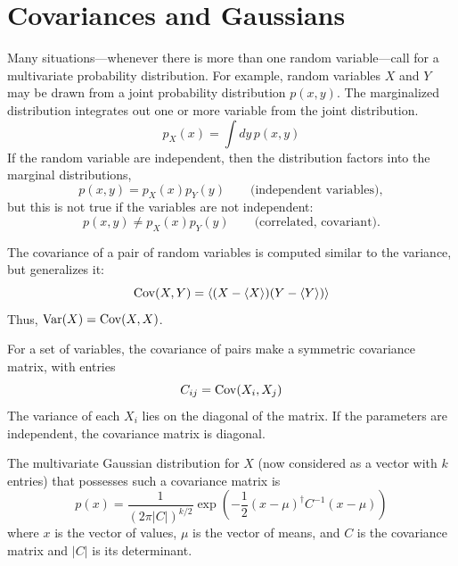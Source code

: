 \section{Covariances and Gaussians}

Many situations---whenever there is more than one random variable---call for a multivariate probability distribution.  For example, random variables $X$ and $Y$ may be drawn from a joint probability distribution $p(x,y)$. The marginalized distribution integrates out one or more variable from the joint distribution.
\begin{equation}
  p_X(x) = \int dy\, p(x,y)
\end{equation}
If the random variable are independent, then the distribution factors into the marginal distributions, 
\begin{equation}
  p(x,y) = p_X(x) p_Y(y)   \qquad\mbox{(independent variables)},
\end{equation}
but this is not true if the variables are not independent:
\begin{equation}
  p(x,y) \neq p_X(x) p_Y(y)   \qquad\mbox{(correlated, covariant)}.
\end{equation}

The covariance of a pair of random variables is computed similar to the variance, but generalizes it:
\begin{equation}
  {\rm Cov}(X,Y) = \left\langle (X - \langle X \rangle)(Y - \langle Y \rangle) \right\rangle
\end{equation}
Thus, ${\rm Var}(X) = {\rm Cov}(X,X)$.

For a set of variables, the covariance of pairs make a symmetric covariance matrix, with entries
\begin{equation}
  C_{ij} = {\rm Cov}(X_i, X_j)
\end{equation}
The variance of each $X_i$ lies on the diagonal of the matrix.  If the parameters are independent, the covariance matrix is diagonal.

The multivariate Gaussian distribution for $X$ (now considered as a vector with $k$ entries) that possesses such a covariance matrix is
\begin{equation}
  p(x) = \frac{1}{(2\pi|C|)^{k/2}} \exp\left(-\frac{1}{2} (x-\mu)^\dag C^{-1} (x-\mu) \right) \label{eqn:gaussian}
\end{equation}
where $x$ is the vector of values, $\mu$ is the vector of means, and $C$ is the covariance matrix and $|C|$ is its determinant.  %

